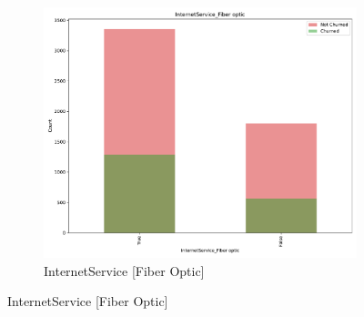 \documentclass[a4paper,11pt]{article}
\begin{document}
\begin{landscape}
\begin{figure}
\begin{subfigure}{0.14\linewidth}
        \includegraphics[width=\linewidth]{figures/understanding/InternetService_Fiber optic.pdf}
        \caption{InternetService [Fiber Optic]}
    \end{subfigure}
    

\end{figure}
\end{landscape}
\end{document}

